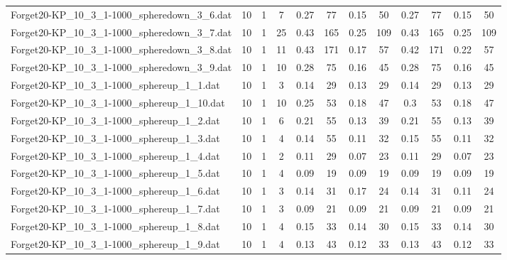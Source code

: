 \begin{sidewaystable}[!ht]
{\begin{tabular}{lccccccccccc}
Forget20-KP\_10\_3\_1-1000\_spheredown\_3\_6.dat & 10 & 1 & 7 & 0.27 & 77 &  \textcolor{blue2}{0.15} & 50 & 0.27 & 77 &  \textcolor{blue2}{0.15} & 50 \\
Forget20-KP\_10\_3\_1-1000\_spheredown\_3\_7.dat & 10 & 1 & 25 & 0.43 & 165 &  \textcolor{blue2}{0.25} & 109 & 0.43 & 165 &  \textcolor{blue2}{0.25} & 109 \\
Forget20-KP\_10\_3\_1-1000\_spheredown\_3\_8.dat & 10 & 1 & 11 & 0.43 & 171 &  \textcolor{blue2}{0.17} & 57 & 0.42 & 171 & 0.22 & 57 \\
Forget20-KP\_10\_3\_1-1000\_spheredown\_3\_9.dat & 10 & 1 & 10 & 0.28 & 75 &  \textcolor{blue2}{0.16} & 45 & 0.28 & 75 &  \textcolor{blue2}{0.16} & 45 \\
Forget20-KP\_10\_3\_1-1000\_sphereup\_1\_1.dat & 10 & 1 & 3 & 0.14 & 29 &  \textcolor{blue2}{0.13} & 29 & 0.14 & 29 &  \textcolor{blue2}{0.13} & 29 \\
Forget20-KP\_10\_3\_1-1000\_sphereup\_1\_10.dat & 10 & 1 & 10 & 0.25 & 53 &  \textcolor{blue2}{0.18} & 47 & 0.3 & 53 &  \textcolor{blue2}{0.18} & 47 \\
Forget20-KP\_10\_3\_1-1000\_sphereup\_1\_2.dat & 10 & 1 & 6 & 0.21 & 55 &  \textcolor{blue2}{0.13} & 39 & 0.21 & 55 &  \textcolor{blue2}{0.13} & 39 \\
Forget20-KP\_10\_3\_1-1000\_sphereup\_1\_3.dat & 10 & 1 & 4 & 0.14 & 55 &  \textcolor{blue2}{0.11} & 32 & 0.15 & 55 &  \textcolor{blue2}{0.11} & 32 \\
Forget20-KP\_10\_3\_1-1000\_sphereup\_1\_4.dat & 10 & 1 & 2 & 0.11 & 29 &  \textcolor{blue2}{0.07} & 23 & 0.11 & 29 &  \textcolor{blue2}{0.07} & 23 \\
Forget20-KP\_10\_3\_1-1000\_sphereup\_1\_5.dat & 10 & 1 & 4 &  \textcolor{blue2}{0.09} & 19 &  \textcolor{blue2}{0.09} & 19 &  \textcolor{blue2}{0.09} & 19 &  \textcolor{blue2}{0.09} & 19 \\
Forget20-KP\_10\_3\_1-1000\_sphereup\_1\_6.dat & 10 & 1 & 3 & 0.14 & 31 & 0.17 & 24 & 0.14 & 31 &  \textcolor{blue2}{0.11} & 24 \\
Forget20-KP\_10\_3\_1-1000\_sphereup\_1\_7.dat & 10 & 1 & 3 &  \textcolor{blue2}{0.09} & 21 &  \textcolor{blue2}{0.09} & 21 &  \textcolor{blue2}{0.09} & 21 &  \textcolor{blue2}{0.09} & 21 \\
Forget20-KP\_10\_3\_1-1000\_sphereup\_1\_8.dat & 10 & 1 & 4 & 0.15 & 33 &  \textcolor{blue2}{0.14} & 30 & 0.15 & 33 &  \textcolor{blue2}{0.14} & 30 \\
Forget20-KP\_10\_3\_1-1000\_sphereup\_1\_9.dat & 10 & 1 & 4 & 0.13 & 43 &  \textcolor{blue2}{0.12} & 33 & 0.13 & 43 &  \textcolor{blue2}{0.12} & 33 \\

\end{tabular}}
\end{sidewaystable}
